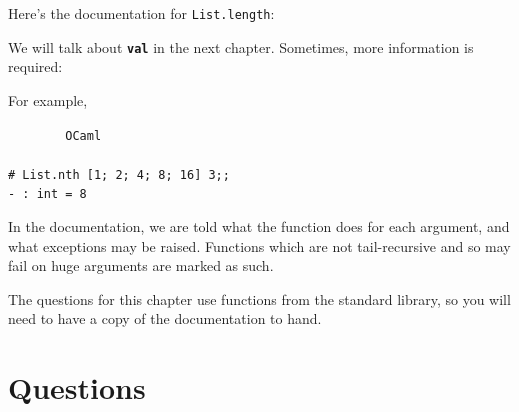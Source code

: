 \documentclass[]{book}
\newcommand{\smspace}{\vspace{4mm}}
\begin{document}
\noindent Here's the documentation for \texttt{List.length}:

\smspace
\noindent{}
\smspace

\noindent We will talk about \texttt{\textbf{val}} in the next chapter. Sometimes, more information is required:

\smspace
\noindent{}
\smspace

\noindent For example,

\smspace
\noindent\verb!        OCaml!\\
\noindent\\
\noindent\texttt{\# List.nth [1; 2; 4; 8; 16] 3;;}\\
\noindent\verb!- : int = 8!
\smspace

\noindent In the documentation, we are told what the function does for each argument, and what exceptions may be raised. Functions which are not tail-recursive and so may fail on huge arguments are marked as such.

The questions for this chapter use functions from the standard library, so you will need to have a copy of the documentation to hand.

\clearpage
\section*{Questions}
\end{document}
